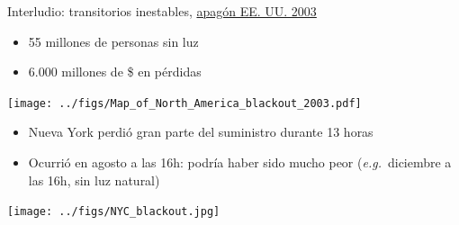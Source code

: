 \documentclass[aspectratio=169, usenames,svgnames,dvipsnames]{beamer}
\begin{document}

\begin{frame}[plain]{Interludio: \hspace{17mm}transitorios inestables, \hspace{10mm}\href{https://en.wikipedia.org/wiki/Northeast_blackout_of_2003}{apagón EE. UU. 2003}}
    \begin{minipage}[c]{0.49\linewidth} 
        
        \vspace{3mm}
        
        \begin{itemize}
            \item \alert{55 millones} de personas sin luz 

            \vspace{1mm}
            \item \alert{6.000 millones de \$} en pérdidas
        \end{itemize}

        \vspace{0mm}
           
        \hspace{-5mm}    
        \texttt{[image: ../figs/Map\_of\_North\_America\_blackout\_2003.pdf]}
        
    \end{minipage}
    \hfill%
    \begin{minipage}[c]{0.5\linewidth}    
    
        \vspace{-10mm}
        \begin{adjustwidth}{-0.5cm}{}%
        \begin{itemize}
            \item \alert{Nueva York} perdió gran parte del suministro durante \alert{13 horas} 
    
            \vspace{2mm}
            \item Ocurrió en agosto a las 16h: \alert{podría haber sido mucho peor} (\textit{e.g.}~diciembre a las 16h, sin luz natural)
        \end{itemize}
        \end{adjustwidth}

        \vspace{2mm}

        \hspace{-1mm} 
        \texttt{[image: ../figs/NYC\_blackout.jpg]}        
    \end{minipage}
\end{frame}
\end{document}

